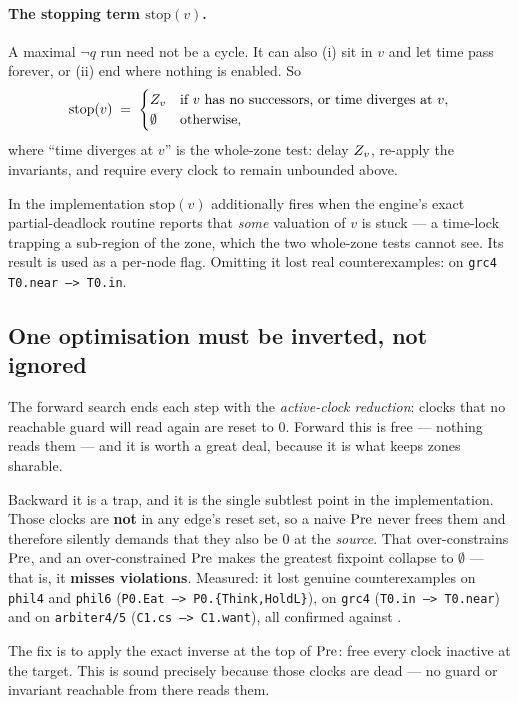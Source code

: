 \paragraph{The stopping term $\mathrm{stop}(v)$.} A maximal $\lnot q$ run need not be a cycle. It can
also (i) sit in $v$ and let time pass forever, or (ii) end where nothing is enabled. So
\[
  \mathrm{stop}(v) \;=\;
  \begin{cases}
    Z_v & \text{if } v \text{ has no successors, or time diverges at } v,\\
    \emptyset & \text{otherwise,}
  \end{cases}
\]
where ``time diverges at $v$'' is the whole-zone test: delay $Z_v$, re-apply the invariants, and
require every clock to remain unbounded above.

In the implementation $\mathrm{stop}(v)$ additionally fires when the engine's exact partial-deadlock
routine reports that \emph{some} valuation of $v$ is stuck --- a time-lock trapping a sub-region of
the zone, which the two whole-zone tests cannot see. Its result is used as a per-node flag. Omitting
it lost real counterexamples: \measured{} on \texttt{grc4} \texttt{T0.near --> T0.in}.

\subsection{One optimisation must be inverted, not ignored}
\label{sec:liveness:activeclock}

The forward search ends each step with the \emph{active-clock reduction}: clocks that no reachable
guard will read again are reset to $0$. Forward this is free --- nothing reads them --- and it is
worth a great deal, because it is what keeps zones sharable.

Backward it is a trap, and it is the single subtlest point in the implementation. Those clocks are
\textbf{not} in any edge's reset set, so a naive $\mathrm{Pre}$ never frees them and therefore silently
demands that they also be $0$ at the \emph{source}. That over-constrains $\mathrm{Pre}$, and an
over-constrained $\mathrm{Pre}$ makes the greatest fixpoint collapse to $\emptyset$ --- that is, it
\textbf{misses violations}. Measured: it lost genuine counterexamples on \texttt{phil4} and
\texttt{phil6} (\texttt{P0.Eat --> P0.\{Think,HoldL\}}), on \texttt{grc4}
(\texttt{T0.in --> T0.near}) and on \texttt{arbiter4/5} (\texttt{C1.cs --> C1.want}), all confirmed
against \verifyta{}.

The fix is to apply the exact inverse at the top of $\mathrm{Pre}$: free every clock inactive at the target.
This is sound precisely because those clocks are dead --- no guard or invariant reachable from there
reads them.

